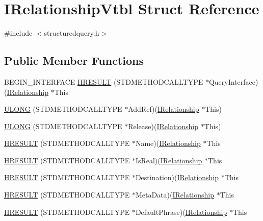 \hypertarget{struct_i_relationship_vtbl}{}\section{I\+Relationship\+Vtbl Struct Reference}
\label{struct_i_relationship_vtbl}


{\ttfamily \#include $<$structuredquery.\+h$>$}

\subsection*{Public Member Functions}
\begin{DoxyCompactItemize}
\item 
B\+E\+G\+I\+N\+\_\+\+I\+N\+T\+E\+R\+F\+A\+CE \hyperlink{struct_i_relationship_vtbl_ad350d69eef2eb2336697d5ca10e2783f}{H\+R\+E\+S\+U\+LT} (S\+T\+D\+M\+E\+T\+H\+O\+D\+C\+A\+L\+L\+T\+Y\+PE $\ast$Query\+Interface)(\hyperlink{structuredquery_8h_a5aa9a48a6dd1c5903470c9ee0e3c80e9}{I\+Relationship} $\ast$This
\item 
\hyperlink{struct_i_relationship_vtbl_a54bd19abfdd8a75890d829398574c415}{U\+L\+O\+NG} (S\+T\+D\+M\+E\+T\+H\+O\+D\+C\+A\+L\+L\+T\+Y\+PE $\ast$Add\+Ref)(\hyperlink{structuredquery_8h_a5aa9a48a6dd1c5903470c9ee0e3c80e9}{I\+Relationship} $\ast$This)
\item 
\hyperlink{struct_i_relationship_vtbl_ab6dd33709e8707cb4b7a894d79735e66}{U\+L\+O\+NG} (S\+T\+D\+M\+E\+T\+H\+O\+D\+C\+A\+L\+L\+T\+Y\+PE $\ast$Release)(\hyperlink{structuredquery_8h_a5aa9a48a6dd1c5903470c9ee0e3c80e9}{I\+Relationship} $\ast$This)
\item 
\hyperlink{struct_i_relationship_vtbl_a868ce4425039882ee5448540cb2a9c02}{H\+R\+E\+S\+U\+LT} (S\+T\+D\+M\+E\+T\+H\+O\+D\+C\+A\+L\+L\+T\+Y\+PE $\ast$Name)(\hyperlink{structuredquery_8h_a5aa9a48a6dd1c5903470c9ee0e3c80e9}{I\+Relationship} $\ast$This
\item 
\hyperlink{struct_i_relationship_vtbl_a522a8e6b7719132ca74c62353e923a15}{H\+R\+E\+S\+U\+LT} (S\+T\+D\+M\+E\+T\+H\+O\+D\+C\+A\+L\+L\+T\+Y\+PE $\ast$Is\+Real)(\hyperlink{structuredquery_8h_a5aa9a48a6dd1c5903470c9ee0e3c80e9}{I\+Relationship} $\ast$This
\item 
\hyperlink{struct_i_relationship_vtbl_a84ea43e4c9a168e0b9274a74b42a564f}{H\+R\+E\+S\+U\+LT} (S\+T\+D\+M\+E\+T\+H\+O\+D\+C\+A\+L\+L\+T\+Y\+PE $\ast$Destination)(\hyperlink{structuredquery_8h_a5aa9a48a6dd1c5903470c9ee0e3c80e9}{I\+Relationship} $\ast$This
\item 
\hyperlink{struct_i_relationship_vtbl_ac962b078cec0ac7ef2184b3cd2afc400}{H\+R\+E\+S\+U\+LT} (S\+T\+D\+M\+E\+T\+H\+O\+D\+C\+A\+L\+L\+T\+Y\+PE $\ast$Meta\+Data)(\hyperlink{structuredquery_8h_a5aa9a48a6dd1c5903470c9ee0e3c80e9}{I\+Relationship} $\ast$This
\item 
\hyperlink{struct_i_relationship_vtbl_a00e0f94f5d4a6fd7d717ad6e04f6858e}{H\+R\+E\+S\+U\+LT} (S\+T\+D\+M\+E\+T\+H\+O\+D\+C\+A\+L\+L\+T\+Y\+PE $\ast$Default\+Phrase)(\hyperlink{structuredquery_8h_a5aa9a48a6dd1c5903470c9ee0e3c80e9}{I\+Relationship} $\ast$This
\end{DoxyCompactItemize}
